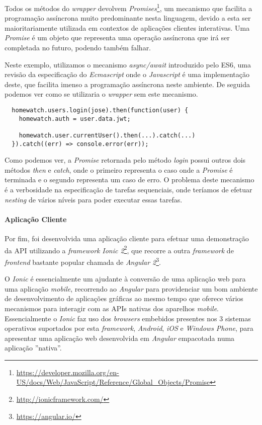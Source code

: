Todos os métodos do \textit{wrapper} devolvem \textit{Promises}\footnote{\url{https://developer.mozilla.org/en-US/docs/Web/JavaScript/Reference/Global_Objects/Promise}}, um mecanismo que facilita a programação assíncrona muito predominante nesta linguagem, devido a esta ser maioritariamente utilizada em contextos de aplicações clientes interativas. Uma \textit{Promise} é um objeto que representa uma operação assíncrona que irá ser completada no futuro, podendo também falhar.

Neste exemplo, utilizamos o mecanismo \textit{async/await} introduzido pelo ES6, uma revisão da especificação do \textit{Ecmascript} onde o \textit{Javascript} é uma implementação deste, que facilita imenso a programação assíncrona neste ambiente. De seguida podemos ver como se utilizaria o \textit{wrapper} sem este mecanismo.

\begin{verbatim}
  homewatch.users.login(jose).then(function(user) {
    homewatch.auth = user.data.jwt;
    
    homewatch.user.currentUser().then(...).catch(...)
  }).catch((err) => console.error(err));
\end{verbatim}

Como podemos ver, a \textit{Promise} retornada pelo método \textit{login} possui outros dois métodos \textit{then} e \textit{catch}, onde o primeiro representa o caso onde a \textit{Promise} é terminada e o segundo representa um caso de erro. O problema deste mecanismo é a verbosidade na especificação de tarefas sequenciais, onde teríamos de efetuar \textit{nesting} de vários níveis para poder executar essas tarefas.

\paragraph*{Aplicação Cliente}

Por fim, foi desenvolvida uma aplicação cliente para efetuar uma demonstração da API utilizando a \textit{framework} \textit{Ionic 2}\footnote{\url{http://ionicframework.com/}}, que recorre a outra \textit{framework} de \textit{frontend} bastante popular chamada de \textit{Angular 2}\footnote{\url{https://angular.io/}}.

O \textit{Ionic} é essencialmente um ajudante à conversão de uma aplicação web para uma aplicação \textit{mobile}, recorrendo ao \textit{Angular} para providenciar um bom ambiente de desenvolvimento de aplicações gráficas ao mesmo tempo que oferece vários mecanismos para interagir com as APIs nativas dos aparelhos \textit{mobile}. Essencialmente o \textit{Ionic} faz uso dos \textit{browsers} embebidos presentes nos 3 sistemas operativos suportados por esta \textit{framework}, \textit{Android}, \textit{iOS} e \textit{Windows Phone}, para apresentar uma aplicação web desenvolvida em \textit{Angular} empacotada numa aplicação ''nativa''.

